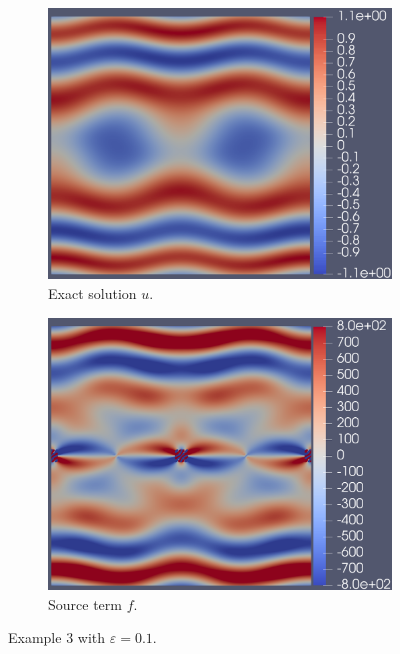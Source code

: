 \documentclass[12pt]{ociamthesis}
\begin{document}
\begin{figure}[H]
 \begin{subfigure}{0.5\textwidth}
     \includegraphics[width=\textwidth]{Pics/uf/U_E3_ep1.png}
     \caption{Exact solution $u$.}
 \end{subfigure}
   \begin{subfigure}{0.5\textwidth}
     \includegraphics[width=\textwidth]{Pics/uf/F_E3_eps_1.png}
     \caption{Source term $f$.}
 \end{subfigure}
 \caption{Example $3$ with $\varepsilon = 0.1$.} \label{E3_uf_01}
\end{figure}
\end{document}
